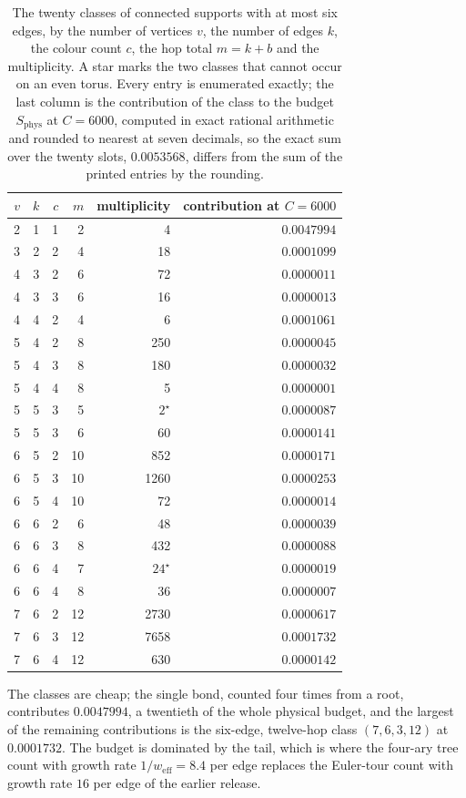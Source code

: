 \documentclass[11pt]{article}
\theoremstyle{plain}
\theoremstyle{definition}
\begin{document}
\begin{table}[t]
\centering
\footnotesize
\caption{The twenty classes of connected supports with at most six edges, by the
number of vertices $v$, the number of edges $k$, the colour count $c$, the hop total
$m=k+b$ and the multiplicity. A star marks the two classes that cannot occur on an
even torus. Every entry is enumerated exactly; the last column is the contribution of
the class to the budget $S_{\mathrm{phys}}$ at $C=6000$, computed in exact rational
arithmetic and rounded to nearest at seven decimals, so the exact sum over the twenty
slots, $0.0053568$, differs from the sum of the printed entries by the rounding.}
\label{tab:classes}
\begin{tabular}{rrrrr r}
\hline
$v$ & $k$ & $c$ & $m$ & multiplicity & contribution at $C=6000$\\
\hline
2 & 1 & 1 & 2 & 4 & $0.0047994$\\
3 & 2 & 2 & 4 & 18 & $0.0001099$\\
4 & 3 & 2 & 6 & 72 & $0.0000011$\\
4 & 3 & 3 & 6 & 16 & $0.0000013$\\
4 & 4 & 2 & 4 & 6 & $0.0001061$\\
5 & 4 & 2 & 8 & 250 & $0.0000045$\\
5 & 4 & 3 & 8 & 180 & $0.0000032$\\
5 & 4 & 4 & 8 & 5 & $0.0000001$\\
5 & 5 & 3 & 5 & $2^{\star}$ & $0.0000087$\\
5 & 5 & 3 & 6 & 60 & $0.0000141$\\
6 & 5 & 2 & 10 & 852 & $0.0000171$\\
6 & 5 & 3 & 10 & 1260 & $0.0000253$\\
6 & 5 & 4 & 10 & 72 & $0.0000014$\\
6 & 6 & 2 & 6 & 48 & $0.0000039$\\
6 & 6 & 3 & 8 & 432 & $0.0000088$\\
6 & 6 & 4 & 7 & $24^{\star}$ & $0.0000019$\\
6 & 6 & 4 & 8 & 36 & $0.0000007$\\
7 & 6 & 2 & 12 & 2730 & $0.0000617$\\
7 & 6 & 3 & 12 & 7658 & $0.0001732$\\
7 & 6 & 4 & 12 & 630 & $0.0000142$\\
\hline
\end{tabular}
\end{table}

The classes are cheap; the single bond, counted four times from a root, contributes
$0.0047994$, a twentieth of the whole physical budget, and the largest of the
remaining contributions is the six-edge, twelve-hop class $(7,6,3,12)$ at
$0.0001732$. The budget is dominated by the tail, which is where the four-ary tree
count with growth rate $1/w_{\mathrm{eff}}=8.4$ per edge replaces the Euler-tour
count with growth rate $16$ per edge of the earlier release.
\end{document}
